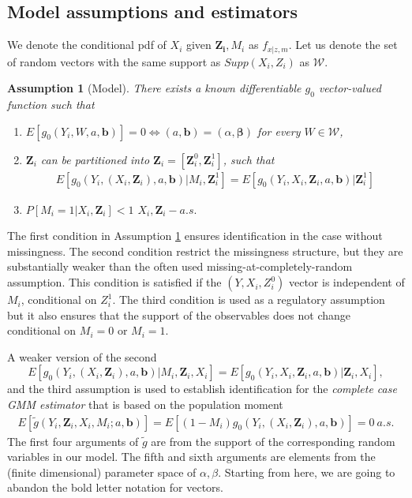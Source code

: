\documentclass{article}
\newtheorem{assumption}{Assumption}
\theoremstyle{definition}
\theoremstyle{remark}
\begin{document}
\subsection{Model assumptions and estimators}
We denote the conditional pdf of $X_i$ given $\mathbf{Z_i}, M_i$ as $f_{x|z,m}$. Let us denote the set of random vectors with the same support as $Supp(X_i,Z_i)$ as $\mathcal{W}$.
\begin{assumption}[Model] \label{ass_model}
There exists a known differentiable $g_0$ vector-valued function such that
\begin{enumerate}
\item $E[g_0(Y_i,W, a, \mathbf{b})] = 0 \iff (a,\mathbf{b})=(\alpha, \mathbf{\beta})$ for every $W \in \mathcal{W}$,
\item {\color{red}$\mathbf{Z}_i$ can be partitioned into $\mathbf{Z}_i= [\mathbf{Z}^0_i, \mathbf{Z}^1_i]$, such that}
\begin{align}
E[g_0(Y_i, (X_i, \mathbf{Z}_i), a, \mathbf{b})|M_i, \mathbf{Z}_i^1] = E[g_0(Y_i, X_i, \mathbf{Z}_i, a, \mathbf{b})|\mathbf{Z}^1_i]
\end{align}
\item $P[M_i=1|X_i,\mathbf{Z}_i]<1$ $X_i,\mathbf{Z}_i-a.s.$
\end{enumerate}
\end{assumption}
The first condition in Assumption \ref{ass_model} ensures identification in the case without missingness. The second condition restrict the missingness structure, but they are substantially weaker than the often used missing-at-completely-random assumption. This condition is satisfied if the $(Y,X_i,Z^0_i)$ vector is independent of $M_i$, conditional on $Z_i^1$. The third condition is used as a regulatory assumption but it also ensures that the support of the observables does not change conditional on $M_i=0$ or $M_i=1$.

A weaker version of the second
\[E[g_0(Y_i, (X_i, \mathbf{Z}_i), a, \mathbf{b})|M_i, \mathbf{Z}_i, X_i] = E[g_0(Y_i, X_i, \mathbf{Z}_i, a, \mathbf{b})|\mathbf{Z}_i, X_i],
\]
and the third assumption is used to establish identification for the \emph{complete case GMM estimator} that is based on the population moment
\begin{align}
E[\tilde{g}(Y_i,\mathbf{Z}_i,X_i,M_i; a,\mathbf{b})] = E\left[(1-M_i) g_0(Y_i, (X_i, \mathbf{Z}_i), a, \mathbf{b})\right]=0 \ a.s.
\end{align}
The first four arguments of $\tilde{g}$ are from the support of the corresponding random variables in our model. The fifth and sixth arguments are elements from  the (finite dimensional) parameter space of $\alpha, \beta$. Starting from here, we are going to abandon the bold letter notation for vectors.
\end{document}
